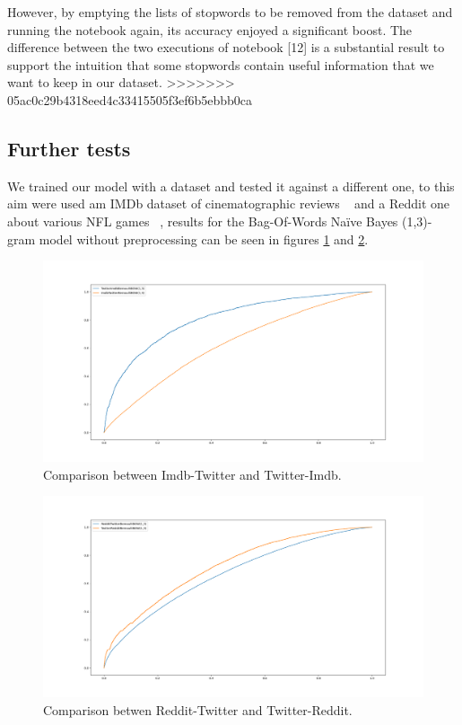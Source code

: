 However,  by emptying the lists of stopwords to be removed from the dataset and running the notebook again,  its accuracy enjoyed a significant boost.  The difference between the two executions of notebook [12] is a substantial result to support the intuition that some stopwords contain useful information that we want to keep in our dataset. 
>>>>>>> 05ac0c29b4318eed4c33415505f3ef6b5ebbb0ca

\subsection*{Further tests}
We trained our model with a dataset and tested it against a different one, to this aim were used am IMDb dataset of cinematographic reviews ~\cite{data:imdb} and a Reddit one about various NFL games ~\cite{data:reddit}, results for the Bag-Of-Words Na\"ive Bayes (1,3)-gram model without preprocessing can be seen in figures \ref{fig:TwitterImdb} and \ref{fig:TwitterReddit}.

\begin{figure}[h!t]
    \centering
    \includegraphics[scale=0.25]{../experiments/plots/ImdbTwitter}
    \caption{Comparison between Imdb-Twitter and Twitter-Imdb.}
    \label{fig:TwitterImdb}        
\end{figure}

\begin{figure}[h!t]
    \centering
    \includegraphics[scale=0.25]{../experiments/plots/RedditTwitter}
    \caption{Comparison betwen Reddit-Twitter and Twitter-Reddit.}
    \label{fig:TwitterReddit}
\end{figure}

